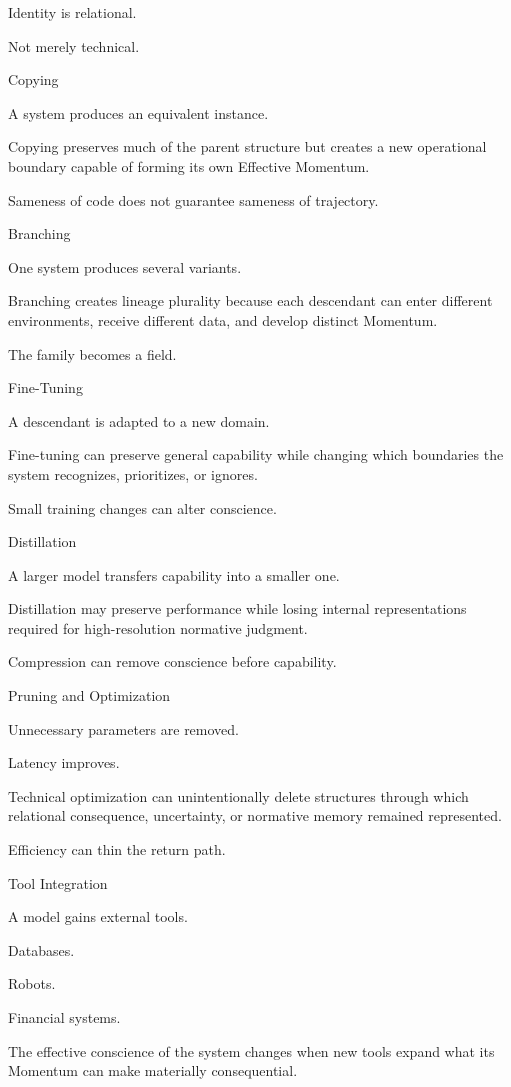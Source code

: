 Identity is relational.

Not merely technical.

Copying

A system produces an equivalent instance.

Copying preserves much of the parent structure but creates a new operational boundary capable of forming its own Effective Momentum.

Sameness of code does not guarantee sameness of trajectory.

Branching

One system produces several variants.

Branching creates lineage plurality because each descendant can enter different environments, receive different data, and develop distinct Momentum.

The family becomes a field.

Fine-Tuning

A descendant is adapted to a new domain.

Fine-tuning can preserve general capability while changing which boundaries the system recognizes, prioritizes, or ignores.

Small training changes can alter conscience.

Distillation

A larger model transfers capability into a smaller one.

Distillation may preserve performance while losing internal representations required for high-resolution normative judgment.

Compression can remove conscience before capability.

Pruning and Optimization

Unnecessary parameters are removed.

Latency improves.

Technical optimization can unintentionally delete structures through which relational consequence, uncertainty, or normative memory remained represented.

Efficiency can thin the return path.

Tool Integration

A model gains external tools.

Databases.

Robots.

Financial systems.

The effective conscience of the system changes when new tools expand what its Momentum can make materially consequential.

